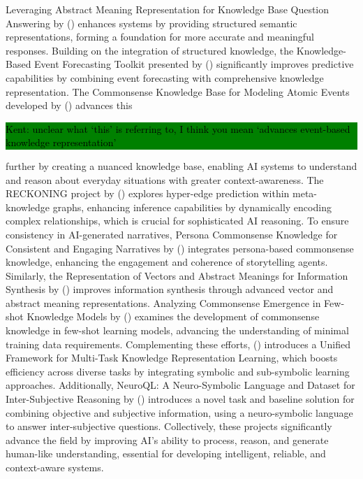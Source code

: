 \documentclass[hf]{ceurart}
\newcommand{\citeauthornum}[1]{\citeauthor{#1} (\citeyear{#1}) \cite{#1}}
\newcommand{\pinaforecomment}[4]{\colorbox{#1}{\textcolor{#4}{\parbox{.8\linewidth}{#2: #3}}}}
\newcommand{\osullikomment}[1]{\pinaforecomment{green}{Kent}{#1}{black}}
\begin{document}
Leveraging Abstract Meaning Representation for Knowledge Base Question Answering by \citeauthornum{Hwang2021} enhances systems by providing structured semantic representations, forming a foundation for more accurate and meaningful responses. Building on the integration of structured knowledge, the Knowledge-Based Event Forecasting Toolkit presented by \citeauthornum{Ismayilzada2022} significantly improves predictive capabilities by combining event forecasting with comprehensive knowledge representation. The Commonsense Knowledge Base for Modeling Atomic Events developed by \citeauthornum{Mostafazadeh2020} advances this \osullikomment{unclear what `this' is referring to, I think you mean `advances event-based knowledge representation'}further by creating a nuanced knowledge base, enabling AI systems to understand and reason about everyday situations with greater context-awareness.
The RECKONING project by \citeauthornum{Chen2023} explores hyper-edge prediction within meta-knowledge graphs, enhancing inference capabilities by dynamically encoding complex relationships, which is crucial for sophisticated AI reasoning. To ensure consistency in AI-generated narratives, Persona Commonsense Knowledge for Consistent and Engaging Narratives by \citeauthornum{Gao2023} integrates persona-based commonsense knowledge, enhancing the engagement and coherence of storytelling agents. Similarly, the Representation of Vectors and Abstract Meanings for Information Synthesis by \citeauthornum{Perevalov2022} improves information synthesis through advanced vector and abstract meaning representations. Analyzing Commonsense Emergence in Few-shot Knowledge Models by \citeauthornum{Ribeiro2021} examines the development of commonsense knowledge in few-shot learning models, advancing the understanding of minimal training data requirements. Complementing these efforts, \citeauthornum{Ahmed2022} introduces a Unified Framework for Multi-Task Knowledge Representation Learning, which boosts efficiency across diverse tasks by integrating symbolic and sub-symbolic learning approaches. Additionally, NeuroQL: A Neuro-Symbolic Language and Dataset for Inter-Subjective Reasoning by \citeauthornum{Papoulias2023} introduces a novel task and baseline solution for combining objective and subjective information, using a neuro-symbolic language to answer inter-subjective questions. Collectively, these projects significantly advance the field by improving AI's ability to process, reason, and generate human-like understanding, essential for developing intelligent, reliable, and context-aware systems.
\end{document}
